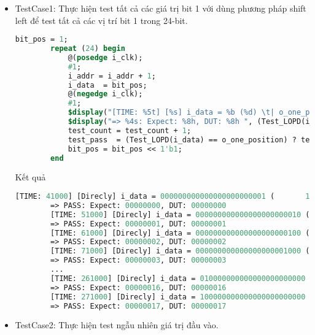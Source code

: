 \begin{itemize}[label=-]
	\item TestCase1: Thực hiện test tất cả các giá trị bit 1 với dùng phương pháp shift left để test tất cả các vị trí bit 1 trong 24-bit.
	
	\begin{lstlisting}[style=StyleCode, language=SystemVerilog, caption={Test 24 trường hợp vị trí bit 1 cho bộ LOPD 24-bit.}]
		bit_pos = 1;
		repeat (24) begin
			@(posedge i_clk);
			#1;
			i_addr = i_addr + 1;
			i_data  = bit_pos;
			@(negedge i_clk);
			#1;
			$display("[TIME: %5t] [%s] i_data = %b (%d) \t| o_one_position = %b (%d) \t| o_zero_flag = %b", $time, "Direcly", i_data, i_data, o_one_position, o_one_position, o_zero_flag);
			$display("=> %4s: Expect: %8h, DUT: %8h ", (Test_LOPD(i_data) == o_one_position) ? "PASS" : "FAIL", o_one_position, Test_LOPD(i_data));
			test_count = test_count + 1;
			test_pass  = (Test_LOPD(i_data) == o_one_position) ? test_pass + 1 : test_pass;
			bit_pos = bit_pos << 1'b1;
		end
	\end{lstlisting}
	
	Kết quả
	
	\begin{lstlisting}[style=StyleResult, language=SystemVerilog, caption={Kết quả của TestCase1.}]
		[TIME: 41000] [Direcly] i_data = 000000000000000000000001 (       1) 	| o_one_position = 00000 ( 0) 	| o_zero_flag = 0
		=> PASS: Expect: 00000000, DUT: 00000000 
		[TIME: 51000] [Direcly] i_data = 000000000000000000000010 (       2) 	| o_one_position = 00001 ( 1) 	| o_zero_flag = 0
		=> PASS: Expect: 00000001, DUT: 00000001 
		[TIME: 61000] [Direcly] i_data = 000000000000000000000100 (       4) 	| o_one_position = 00010 ( 2) 	| o_zero_flag = 0
		=> PASS: Expect: 00000002, DUT: 00000002 
		[TIME: 71000] [Direcly] i_data = 000000000000000000001000 (       8) 	| o_one_position = 00011 ( 3) 	| o_zero_flag = 0
		=> PASS: Expect: 00000003, DUT: 00000003 
		...
		[TIME: 261000] [Direcly] i_data = 010000000000000000000000 ( 4194304) 	| o_one_position = 10110 (22) 	| o_zero_flag = 0
		=> PASS: Expect: 00000016, DUT: 00000016 
		[TIME: 271000] [Direcly] i_data = 100000000000000000000000 ( 8388608) 	| o_one_position = 10111 (23) 	| o_zero_flag = 0
		=> PASS: Expect: 00000017, DUT: 00000017 
	\end{lstlisting}

	\item TestCase2: Thực hiện test ngẫu nhiên giá trị đầu vào.
	

\end{itemize}
